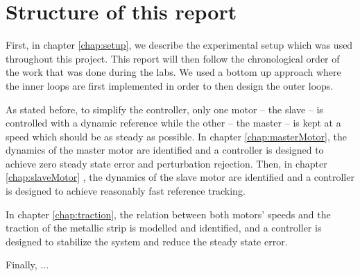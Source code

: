 \section{Structure of this report}
First, in chapter \ref{chap:setup}, we describe the experimental setup which was used throughout this project. This report will then follow the chronological order of the work that was done during the labs. We used a bottom up approach where the inner loops are first implemented in order to then design the outer loops.

As stated before, to simplify the controller, only one motor -- the slave -- is controlled with a dynamic reference while the other -- the master -- is kept at a speed which should be as steady as possible. In chapter \ref{chap:masterMotor}, the dynamics of the master motor are identified and a controller is designed to achieve zero steady state error and perturbation rejection. Then, in chapter \ref{chap:slaveMotor} , the dynamics of the slave motor are identified and a controller is designed to achieve reasonably fast reference tracking.

In chapter \ref{chap:traction}, the relation between both motors' speeds and the traction of the metallic strip is modelled and identified, and a controller is designed to stabilize the system and reduce the steady state error.

Finally, ... 
